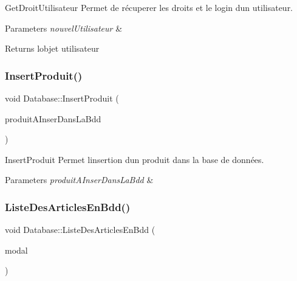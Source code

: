 Get\+Droit\+Utilisateur Permet de récuperer les droits et le login d\textquotesingle{}un utilisateur. 


\begin{DoxyParams}{Parameters}
{\em nouvel\+Utilisateur} & \\
\hline
\end{DoxyParams}
\begin{DoxyReturn}{Returns}
l\textquotesingle{}objet utilisateur 
\end{DoxyReturn}
\mbox{\label{class_database_a876113e6495199697973a3820d72c744}} 
\subsubsection{\texorpdfstring{Insert\+Produit()}{InsertProduit()}}
{\footnotesize\ttfamily void Database\+::\+Insert\+Produit (\begin{DoxyParamCaption}\item[{\mbox{\hyperlink{class_article}{Article}} \&}]{produit\+A\+Inser\+Dans\+La\+Bdd }\end{DoxyParamCaption})}



Insert\+Produit Permet l\textquotesingle{}insertion d\textquotesingle{}un produit dans la base de données. 


\begin{DoxyParams}{Parameters}
{\em produit\+A\+Inser\+Dans\+La\+Bdd} & \\
\hline
\end{DoxyParams}
\mbox{\label{class_database_ab2c30b7afdf7bfd699a142739c66e447}} 
\subsubsection{\texorpdfstring{Liste\+Des\+Articles\+En\+Bdd()}{ListeDesArticlesEnBdd()}}
{\footnotesize\ttfamily void Database\+::\+Liste\+Des\+Articles\+En\+Bdd (\begin{DoxyParamCaption}\item[{Q\+Sql\+Query\+Model $\ast$}]{modal }\end{DoxyParamCaption})}



